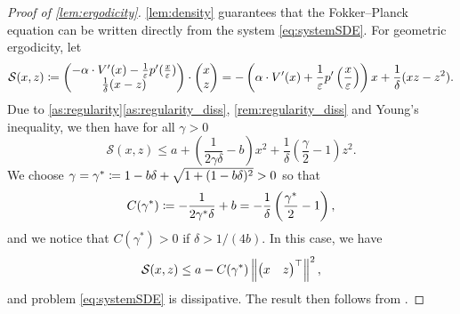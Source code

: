\documentclass[review,onefignum,onetabnum]{siamonline190516}
\begin{document}
\begin{appendices}
\begin{proof}[Proof of \cref{lem:ergodicity}] \cref{lem:density} guarantees that the Fokker--Planck equation can be written directly from the system \eqref{eq:systemSDE}. For geometric ergodicity, let 
	\begin{equation}
	\mathcal S(x,z) \coloneqq \begin{pmatrix} -\alpha \cdot V'(x) - \frac1{\varepsilon} p'(\frac{x}{\varepsilon}) \\ \frac1\delta (x - z) \end{pmatrix} \cdot \begin{pmatrix} x \\ z \end{pmatrix} =  -\left(\alpha \cdot V'(x) + \frac1{\varepsilon} p'\left(\frac{x}{\varepsilon}\right)\right)x + \frac1\delta(xz-z^2).
	\end{equation}
	Due to \cref{as:regularity}\ref{as:regularity_diss}, \cref{rem:regularity_diss} and Young's inequality, we then have for all $\gamma > 0$
	\begin{equation}
	\mathcal S(x,z) \leq a + \left(\frac{1}{2\gamma\delta} - b\right)x^2 + \frac1\delta\left(\frac{\gamma}{2} - 1\right)z^2.
	\end{equation}
	We choose $\gamma = \gamma^* \coloneqq 1 - b\delta + \sqrt{1 + (1 - b\delta)^2} > 0$ so that
	\begin{equation}
	C(\gamma^*) \coloneqq -\frac{1}{2\gamma^*\delta} + b = -\frac1\delta\left(\frac{\gamma^*}{2} - 1\right),
	\end{equation}
	and we notice that $C(\gamma^*) > 0$ if $\delta > 1/(4b)$. In this case, we have
	\begin{equation}
	\mathcal S(x, z) \leq a - C(\gamma^*) \left\|\begin{pmatrix} x & z \end{pmatrix}^\top\right\|^2,
	\end{equation}
	and problem \eqref{eq:systemSDE} is dissipative. The result then follows from \cite[Theorem 4.4]{MSH02}.
\end{proof}


\end{appendices}
\end{document}
